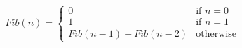 \documentclass[12pt]{article}
\begin{document}
\sicpsize
\[
Fib(n) = 
   \begin{cases}
       0 & \text{if } n = 0 \\
       1 & \text{if } n = 1 \\
       Fib(n-1) + Fib(n-2) & \text{otherwise}
    \end{cases}
\]
\end{document}
